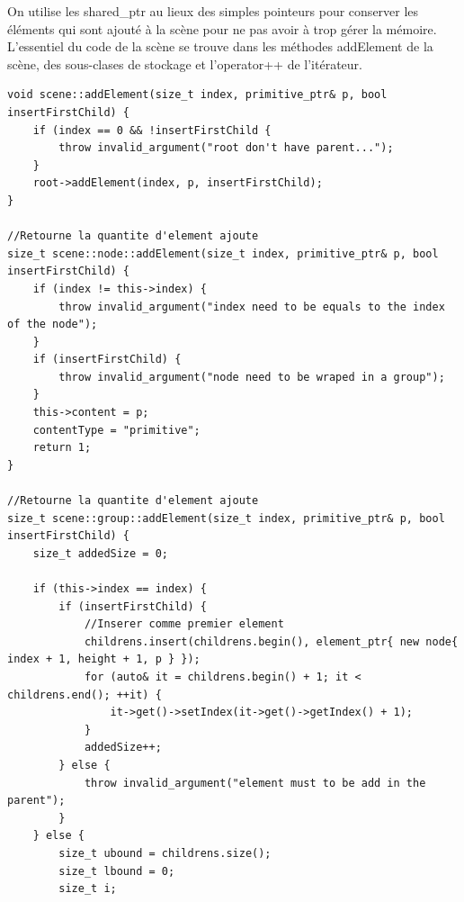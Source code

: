 On utilise les shared\_ptr au lieux des simples pointeurs pour conserver les éléments qui sont ajouté à la scène pour ne pas avoir à trop gérer la mémoire.\\

L'essentiel du code de la scène se trouve dans les méthodes addElement de la scène, des sous-clases de stockage et l'operator++ de l'itérateur.\\

\begin{lstlisting}
void scene::addElement(size_t index, primitive_ptr& p, bool insertFirstChild) {
	if (index == 0 && !insertFirstChild {
		throw invalid_argument("root don't have parent...");
	}
	root->addElement(index, p, insertFirstChild);
}

//Retourne la quantite d'element ajoute
size_t scene::node::addElement(size_t index, primitive_ptr& p, bool insertFirstChild) {
	if (index != this->index) {
		throw invalid_argument("index need to be equals to the index of the node");
	}
	if (insertFirstChild) {
		throw invalid_argument("node need to be wraped in a group");
	}
	this->content = p;
	contentType = "primitive";
	return 1;
}

//Retourne la quantite d'element ajoute
size_t scene::group::addElement(size_t index, primitive_ptr& p, bool insertFirstChild) {
	size_t addedSize = 0;
	
	if (this->index == index) {
		if (insertFirstChild) {
			//Inserer comme premier element
			childrens.insert(childrens.begin(), element_ptr{ new node{ index + 1, height + 1, p } });
			for (auto& it = childrens.begin() + 1; it < childrens.end(); ++it) {
				it->get()->setIndex(it->get()->getIndex() + 1);
			}
			addedSize++;
		} else {
			throw invalid_argument("element must to be add in the parent");
		}
	} else {
		size_t ubound = childrens.size();
		size_t lbound = 0;
		size_t i;
		

\end{lstlisting}
